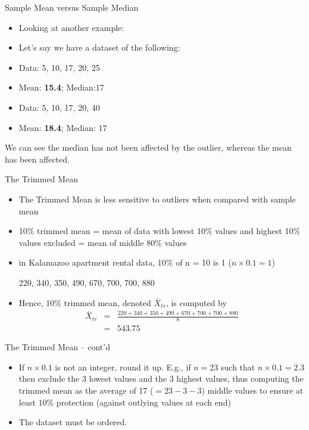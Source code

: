 \documentclass[14pt]{beamer}\usepackage[]{graphicx}\usepackage[]{color}
\begin{document}
\begin{frame}[fragile]{Sample Mean versus Sample Median}

\begin{itemize}
\item Looking at another example:
\item Let's say we have a dataset of the following:  
\item Data: 5, 10, 17, 20, 25
\item Mean: \textbf{15.4}; Median:17
\item Data: 5, 10, 17, 20, 40
\item Mean: \textbf{18.4};  Median: 17
\end{itemize}

We can see the median has not been affected by the outlier, whereas the  mean has been affected.

\end{frame}

\begin{frame}[fragile]{The Trimmed Mean}


{\small{
\begin{itemize}
\item<1-> The Trimmed Mean is less sensitive to outliers when compared with sample mean  
\item<2-> 10\% trimmed mean = mean of data with lowest 10\% values and  highest 10\% values excluded = mean of middle 80\% values
\item<3-> in Kalamazoo apartment rental data, 10\% of n = 10 is 1 ($n \times 0.1 = 1$)

220, 340, 350, 490, 670, 700, 700, 880
\item<4-> Hence, 10\% trimmed mean, denoted $\bar{X}_{tr}$, is computed by
\begin{eqnarray*}
\bar{X}_{tr} &=& \frac{220+340+350+490+670+700+700+880}{8} \\
     &=&543.75
\end{eqnarray*}
\end{itemize}
}}
\end{frame}

\begin{frame}[fragile]{The Trimmed Mean -- cont'd}

\begin{itemize}
\item<1-> If $n \times 0.1$ is not an integer, round it up. E.g., if $n = 23$ such that  $n \times 0.1 = 2.3$ then exclude the 3 lowest values and the 3 highest values, thus computing the trimmed mean as the  average of 17 ($= 23 - 3 - 3$) middle values to ensure at least  10\% protection (against outlying values at each end)

\item<2-> The dataset must be ordered.
\end{itemize}

\end{frame}
\end{document}
